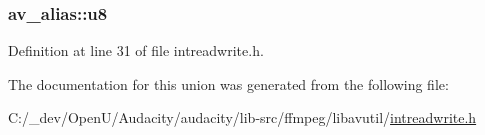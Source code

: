 \subsubsection[{\texorpdfstring{u8}{u8}}]{ av\+\_\+alias\+::u8}\hypertarget{unionav__alias_a7f6d1b60592207433aabf0f688f93b1d}{}\label{unionav__alias_a7f6d1b60592207433aabf0f688f93b1d}


Definition at line 31 of file intreadwrite.\+h.



The documentation for this union was generated from the following file\+:\begin{DoxyCompactItemize}
\item 
C\+:/\+\_\+dev/\+Open\+U/\+Audacity/audacity/lib-\/src/ffmpeg/libavutil/\hyperlink{intreadwrite_8h}{intreadwrite.\+h}\end{DoxyCompactItemize}
